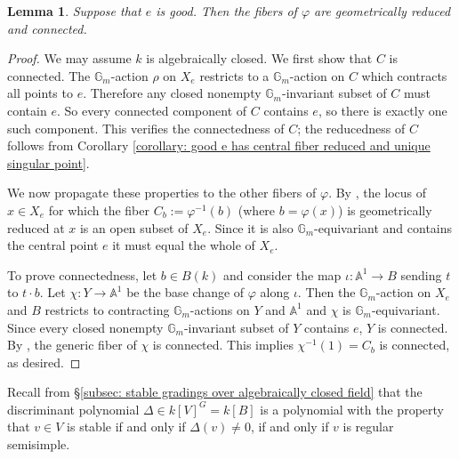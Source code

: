 \documentclass{article} %
\newtheorem{lemma}[proposition]{Lemma}
\numberwithin{equation}{section}
\theoremstyle{definition}
\newcommand{\G}{\mathbb{G}}
\newcommand{\A}{\mathbb{A}}
\begin{document}
\begin{lemma}\label{lemma: fibers are connected}
    Suppose that $e$ is good. 
    Then the fibers of $\varphi$ are geometrically reduced and connected.
\end{lemma}
\begin{proof}
    We may assume $k$ is algebraically closed.
    We first show that $C$ is connected.
    The $\G_m$-action $\rho$ on $X_e$ restricts to a $\G_m$-action on $C$ which contracts all points to $e$.
    Therefore any closed nonempty $\G_m$-invariant subset of $C$ must contain $e$.
    So every connected component of $C$ contains $e$, so there is exactly one such component.
    This verifies the connectedness of $C$; the reducedness of $C$ follows from Corollary \ref{corollary: good e has central fiber reduced and unique singular point}. 

    We now propagate these properties to the other fibers of $\varphi$. 
    By \cite[Corollaire 12.1.7(vi)]{EGAIV-3}, the locus of $x\in X_e$  for which the fiber $C_b:= \varphi^{-1}(b)$ (where $b = \varphi(x)$) is geometrically reduced at $x$ is an open subset of $X_e$. Since it is also $\G_m$-equivariant and contains the central point $e$ it must equal the whole of $X_e$.

    To prove connectedness, let $b\in B(k)$ and consider the map $\iota\colon \A^1\rightarrow B$ sending $t$ to $t\cdot b$.
    Let $\chi\colon Y\rightarrow \A^1$ be the base change of $\varphi$ along $\iota$.
    Then the $\G_m$-action on $X_e$ and $B$ restricts to contracting $\G_m$-actions on $Y$ and $\A^1$ and $\chi$ is $\G_m$-equivariant.
    Since every closed nonempty $\G_m$-invariant subset of $Y$ contains $e$, $Y$ is connected.
    By \cite[Tag \href{https://stacks.math.columbia.edu/tag/055J}{055J}]{stacksproject}, the generic fiber of $\chi$ is connected.
    This implies $\chi^{-1}(1) = C_b$ is connected, as desired.
\end{proof}


Recall from \S\ref{subsec: stable gradings over algebraically closed field} that the discriminant polynomial $\Delta\in k[V]^G = k[B]$ is a polynomial with the property that $v\in V$ is stable if and only if $\Delta(v)\neq 0$, if and only if $v$ is regular semisimple.
\end{document}
